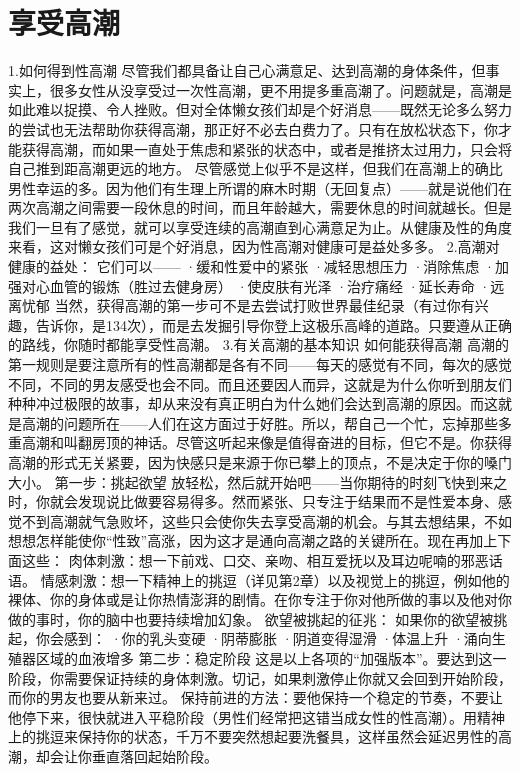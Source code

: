 \documentclass[12pt,UTF8,openany]{ctexbook}
\begin{document}
\chapter{享受高潮}
1.如何得到性高潮
尽管我们都具备让自己心满意足、达到高潮的身体条件，但事实上，很多女性从没享受过一次性高潮，更不用提多重高潮了。问题就是，高潮是如此难以捉摸、令人挫败。但对全体懒女孩们却是个好消息——既然无论多么努力的尝试也无法帮助你获得高潮，那正好不必去白费力了。只有在放松状态下，你才能获得高潮，而如果一直处于焦虑和紧张的状态中，或者是推挤太过用力，只会将自己推到距高潮更远的地方。
尽管感觉上似乎不是这样，但我们在高潮上的确比男性幸运的多。因为他们有生理上所谓的麻木时期（无回复点）——就是说他们在两次高潮之间需要一段休息的时间，而且年龄越大，需要休息的时间就越长。但是我们一旦有了感觉，就可以享受连续的高潮直到心满意足为止。从健康及性的角度来看，这对懒女孩们可是个好消息，因为性高潮对健康可是益处多多。
2.高潮对健康的益处：
它们可以——
·缓和性爱中的紧张
·减轻思想压力
·消除焦虑
·加强对心血管的锻炼（胜过去健身房）
·使皮肤有光泽
·治疗痛经
·延长寿命
·远离忧郁
当然，获得高潮的第一步可不是去尝试打败世界最佳纪录（有过你有兴趣，告诉你，是134次），而是去发掘引导你登上这极乐高峰的道路。只要遵从正确的路线，你随时都能享受性高潮。
3.有关高潮的基本知识
如何能获得高潮
高潮的第一规则是要注意所有的性高潮都是各有不同——每天的感觉有不同，每次的感觉不同，不同的男友感受也会不同。而且还要因人而异，这就是为什么你听到朋友们种种冲过极限的故事，却从来没有真正明白为什么她们会达到高潮的原因。而这就是高潮的问题所在——人们在这方面过于好胜。所以，帮自己一个忙，忘掉那些多重高潮和叫翻房顶的神话。尽管这听起来像是值得奋进的目标，但它不是。你获得高潮的形式无关紧要，因为快感只是来源于你已攀上的顶点，不是决定于你的嗓门大小。
第一步：挑起欲望
放轻松，然后就开始吧——当你期待的时刻飞快到来之时，你就会发现说比做要容易得多。然而紧张、只专注于结果而不是性爱本身、感觉不到高潮就气急败坏，这些只会使你失去享受高潮的机会。与其去想结果，不如想想怎样能使你“性致”高涨，因为这才是通向高潮之路的关键所在。现在再加上下面这些：
肉体刺激：想一下前戏、口交、亲吻、相互爱抚以及耳边呢喃的邪恶话语。
情感刺激：想一下精神上的挑逗（详见第2章）以及视觉上的挑逗，例如他的裸体、你的身体或是让你热情澎湃的剧情。在你专注于你对他所做的事以及他对你做的事时，你的脑中也要持续增加幻象。
欲望被挑起的征兆：
如果你的欲望被挑起，你会感到：
·你的乳头变硬
·阴蒂膨胀
·阴道变得湿滑
·体温上升
·涌向生殖器区域的血液增多
第二步：稳定阶段
这是以上各项的“加强版本”。要达到这一阶段，你需要保证持续的身体刺激。切记，如果刺激停止你就又会回到开始阶段，而你的男友也要从新来过。
保持前进的方法：要他保持一个稳定的节奏，不要让他停下来，很快就进入平稳阶段（男性们经常把这错当成女性的性高潮）。用精神上的挑逗来保持你的状态，千万不要突然想起要洗餐具，这样虽然会延迟男性的高潮，却会让你垂直落回起始阶段。
\end{document}
